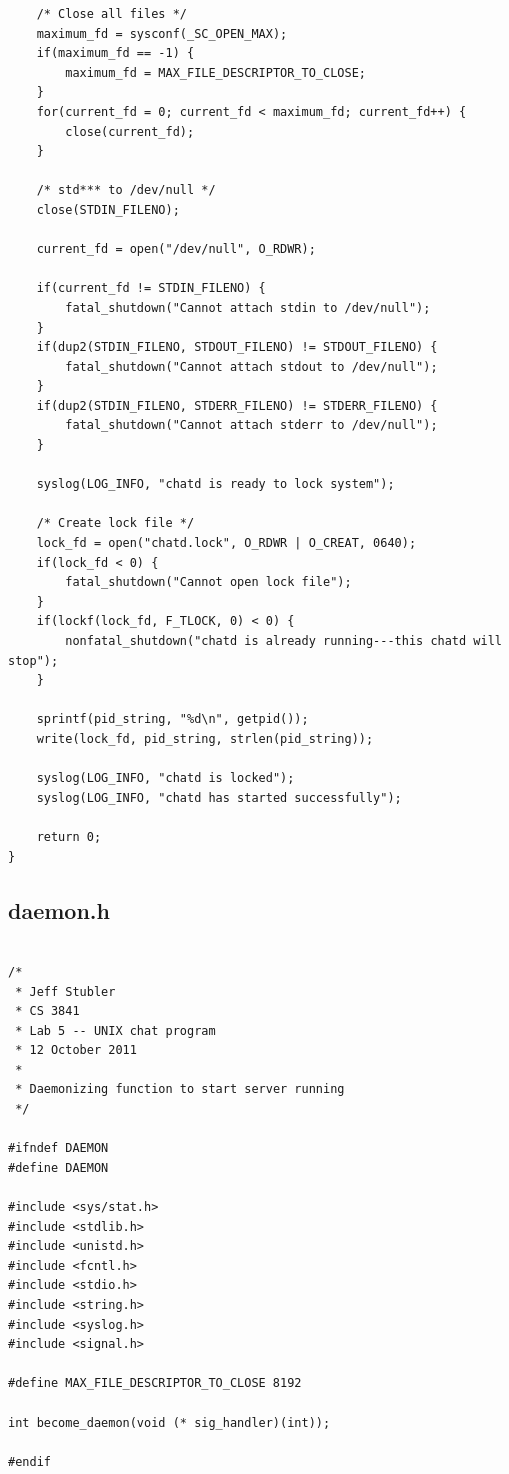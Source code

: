 \documentclass{article}
\begin{document}
\begin{verbatim}
    /* Close all files */
    maximum_fd = sysconf(_SC_OPEN_MAX);
    if(maximum_fd == -1) {
        maximum_fd = MAX_FILE_DESCRIPTOR_TO_CLOSE;
    }
    for(current_fd = 0; current_fd < maximum_fd; current_fd++) {
        close(current_fd);
    }
    
    /* std*** to /dev/null */
    close(STDIN_FILENO);
    
    current_fd = open("/dev/null", O_RDWR);
    
    if(current_fd != STDIN_FILENO) {
        fatal_shutdown("Cannot attach stdin to /dev/null");
    }
    if(dup2(STDIN_FILENO, STDOUT_FILENO) != STDOUT_FILENO) {
        fatal_shutdown("Cannot attach stdout to /dev/null");
    }
    if(dup2(STDIN_FILENO, STDERR_FILENO) != STDERR_FILENO) {
        fatal_shutdown("Cannot attach stderr to /dev/null");
    }
    
    syslog(LOG_INFO, "chatd is ready to lock system");
    
    /* Create lock file */
    lock_fd = open("chatd.lock", O_RDWR | O_CREAT, 0640);
    if(lock_fd < 0) {
        fatal_shutdown("Cannot open lock file");
    }
    if(lockf(lock_fd, F_TLOCK, 0) < 0) {
        nonfatal_shutdown("chatd is already running---this chatd will stop");
    }
    
    sprintf(pid_string, "%d\n", getpid());
    write(lock_fd, pid_string, strlen(pid_string));
    
    syslog(LOG_INFO, "chatd is locked");
    syslog(LOG_INFO, "chatd has started successfully");
    
    return 0;
}

\end{verbatim}

\subsection*{daemon.h}

\begin{verbatim}

/*
 * Jeff Stubler
 * CS 3841
 * Lab 5 -- UNIX chat program
 * 12 October 2011
 *
 * Daemonizing function to start server running
 */

#ifndef DAEMON
#define DAEMON

#include <sys/stat.h>
#include <stdlib.h>
#include <unistd.h>
#include <fcntl.h>
#include <stdio.h>
#include <string.h>
#include <syslog.h>
#include <signal.h>

#define MAX_FILE_DESCRIPTOR_TO_CLOSE 8192

int become_daemon(void (* sig_handler)(int)); 

#endif

\end{verbatim}
\end{document}
